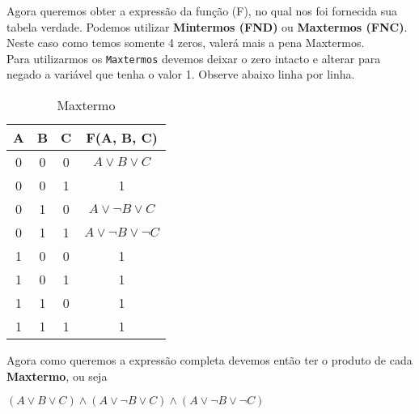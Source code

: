 \documentclass[12pt, onecolumn]{article}
\begin{document}
	Agora queremos obter a expressão da função (F), no qual nos foi fornecida
	sua tabela verdade. Podemos utilizar \textbf{Mintermos (FND)} ou 
	\textbf{Maxtermos (FNC)}. Neste caso como temos somente 4 zeros, valerá 
	mais a pena Maxtermos. \\
	\newline
	Para utilizarmos os \texttt{Maxtermos} devemos deixar o zero intacto e alterar 
	para negado a variável que tenha o valor 1. Observe abaixo linha por linha. \\
	\newline
	\begin{table}[ht]
                \centering
                \begin{tabular}{|c|c|c|c|}
                        \hline
                        A & B & C & F(A, B, C)\\ \hline

                        0 & 0 & 0 & $A \lor B \lor C$ \\ \hline %
                        0 & 0 & 1 & 1 \\ \hline
			0 & 1 & 0 & $A \lor \lnot{B} \lor C$ \\ \hline %
			0 & 1 & 1 & $A \lor \lnot{B} \lor \lnot{C}$ \\ \hline %
                        1 & 0 & 0 & 1 \\ \hline
                        1 & 0 & 1 & 1 \\ \hline
                        1 & 1 & 0 & 1 \\ \hline
                        1 & 1 & 1 & 1 \\ \hline
                \end{tabular}
		\caption{Maxtermo}
        \end{table}
	
	Agora como queremos a expressão completa devemos então ter 
	o produto de cada \textbf{Maxtermo}, ou seja \\
	\begin{center} 
		$ %
		(A \lor B \lor C) \land 
		(A \lor \lnot{B} \lor C) \land 
		(A \lor \lnot{B} \lor \lnot{C})
		$ 
	\end{center} 
	
\end{document}
